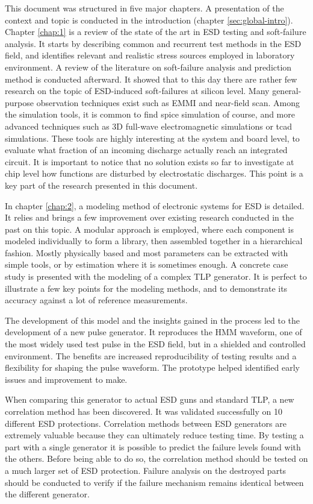This document was structured in five major chapters.
A presentation of the context and topic is conducted in the introduction (chapter \ref{sec:global-intro}).
Chapter \ref{chap:1} is a review of the state of the art in ESD testing and soft-failure analysis.
It starts by describing common and recurrent test methods in the ESD field, and identifies relevant and realistic stress sources employed in laboratory environment.
A review of the literature on soft-failure analysis and prediction method is conducted afterward.
It showed that to this day there are rather few research on the topic of ESD-induced soft-failures at silicon level.
Many general-purpose observation techniques exist such as EMMI and near-field scan.
Among the simulation tools, it is common to find \gls{spice} simulation of course, and more advanced techniques such as 3D full-wave electromagnetic simulations or \gls{tcad} simulations.
These tools are highly interesting at the system and board level, to evaluate what fraction of an incoming discharge actually reach an integrated circuit.
It is important to notice that no solution exists so far to investigate at chip level how functions are disturbed by electrostatic discharges.
This point is a key part of the research presented in this document.

In chapter \ref{chap:2}, a modeling method of electronic systems for ESD is detailed.
It relies and brings a few improvement over existing research conducted in the past on this topic.
A modular approach is employed, where each component is modeled individually to form a library, then assembled together in a hierarchical fashion.
Mostly physically based and most parameters can be extracted with simple tools, or by estimation where it is sometimes enough.
A concrete case study is presented with the modeling of a complex TLP generator.
It is perfect to illustrate a few key points for the modeling methods, and to demonstrate its accuracy against a lot of reference measurements.

The development of this model and the insights gained in the process led to the development of a new pulse generator.
It reproduces the HMM waveform, one of the most widely used test pulse in the ESD field, but in a shielded and controlled environment.
The benefits are increased reproducibility of testing results and a flexibility for shaping the pulse waveform.
The prototype helped identified early issues and improvement to make.

When comparing this generator to actual ESD guns and standard TLP, a new correlation method has been discovered.
It was validated successfully on 10 different ESD protections.
Correlation methods between ESD generators are extremely valuable because they can ultimately reduce testing time.
By testing a part with a single generator it is possible to predict the failure levels found with the others.
Before being able to do so, the correlation method should be tested on a much larger set of ESD protection.
Failure analysis on the destroyed parts should be conducted to verify if the failure mechanism remains identical between the different generator.


